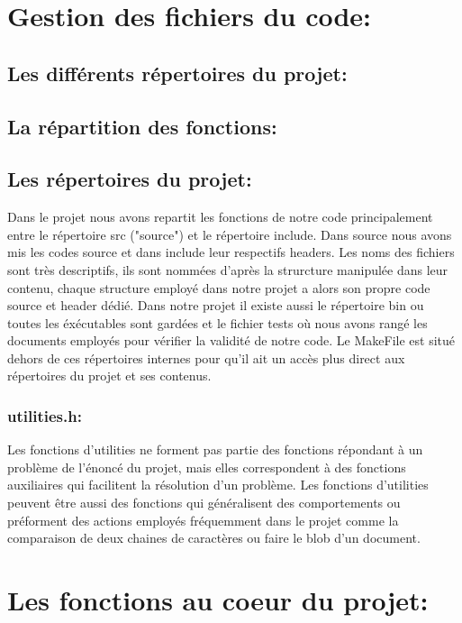 \documentclass[12pt,francais]{article}
\begin{document}
\section{Gestion des fichiers du code:}
\subsection{Les différents répertoires du projet:}
\subsection{La répartition des fonctions:}
\subsection{Les répertoires du projet:}
	Dans le projet nous avons repartit les fonctions de notre code principalement entre le répertoire  src ("source") et le répertoire include. Dans source nous avons mis les codes source et dans include leur respectifs headers.
	Les noms des fichiers sont très descriptifs, ils sont nommées d'après la strurcture manipulée dans leur contenu, chaque structure employé dans notre projet a alors son propre code source et header dédié. \newline
	Dans notre projet il existe aussi le répertoire bin ou toutes les éxécutables sont gardées et le fichier tests où nous avons rangé les documents employés pour vérifier la validité de notre code.
	Le MakeFile est situé dehors de ces répertoires internes pour qu'il ait un accès plus direct aux répertoires du projet et ses contenus.
\subsubsection{utilities.h:}
	Les fonctions d'utilities ne forment pas partie des fonctions répondant à un problème de l'énoncé du projet, mais elles correspondent à des fonctions auxiliaires qui facilitent la résolution d'un problème. Les fonctions d'utilities peuvent être aussi  des fonctions qui généralisent des comportements ou préforment des actions employés fréquemment dans le projet comme la comparaison de deux chaines de caractères ou faire le blob d'un document. 
\section{Les fonctions au coeur du projet:}
\end{document}
